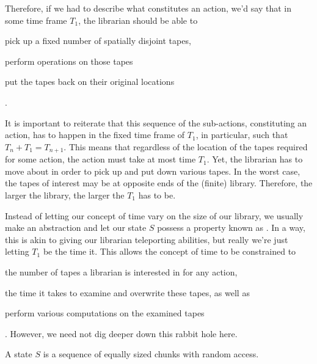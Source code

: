 
Therefore, if we had to describe what constitutes an action, we'd say that in
some time frame $T_1$, the librarian should be able to \begin{inparaenum}[(1)]
\item pick up a fixed number of spatially disjoint tapes, \item perform
operations on those tapes \item put the tapes back on their original
locations\end{inparaenum}.

It is important to reiterate that this sequence of the sub-actions,
constituting an action, has to happen in the fixed time frame of $T_1$, in
particular, such that $T_n+T_1=T_{n+1}$.  This means that regardless of the
location of the tapes required for some action, the action must take at most
time $T_1$. Yet, the librarian has to move about in order to pick up and put
down various tapes. In the worst case, the tapes of interest may be at opposite
ends of the (finite) library. Therefore, the larger the library, the larger the
$T_1$ has to be. 

Instead of letting our concept of time vary on the size of our library, we
usually make an abstraction and let our state $S$ possess a property known as
. In a way, this is akin to giving our librarian teleporting
abilities, but really we're just letting $T_1$ be the time it. This allows the
concept of time to be constrained to \begin{inparaenum}[(1)] \item the number
of tapes a librarian is interested in for any action, \item the time it takes
to examine and overwrite these tapes, as well as \item perform various
computations on the examined tapes\end{inparaenum}. However, we need not dig
deeper down this rabbit hole here.

\begin{definition}

A state $S$ is a sequence of equally sized chunks with random access.

\end{definition}

